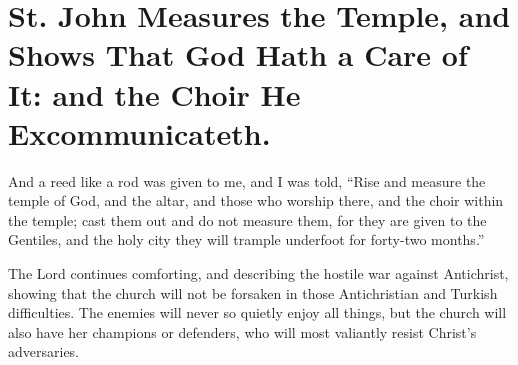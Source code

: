 \chapter[Sermon 46. St. John Measures the Temple, and Shows That God Hath a Care of It: and the Choir He Excommunicateth.]{St. John Measures the Temple, and Shows That God Hath a Care of It: and the Choir He Excommunicateth.}
\label{sermon:046}

And a reed like a rod was given to me, and I was told, “Rise and measure the temple of God, and the altar, and those who worship there, and the choir within the temple; cast them out and do not measure them, for they are given to the Gentiles, and the holy city they will trample underfoot for forty-two months.”

The Lord continues comforting, and describing the hostile war against Antichrist, showing that the church will not be forsaken in those Antichristian and Turkish difficulties. The enemies will never so quietly enjoy all things, but the church will also have her champions or defenders, who will most valiantly resist Christ's adversaries.

